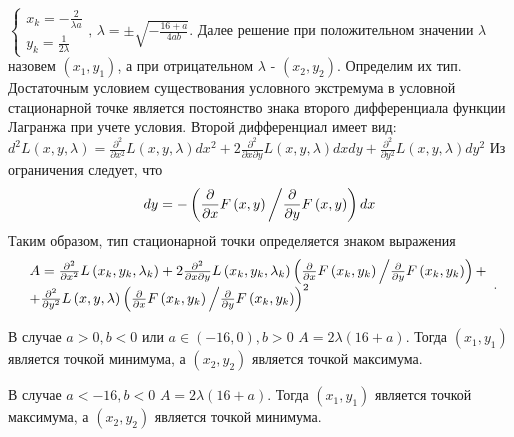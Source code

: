 \documentclass[addpoints, answers]{exam} %
\begin{document}
\begin{questions}
\begin{solution}
 $\left\{\begin{array}{c} {x_{k} =-\frac{2}{\lambda a} } \\ {y_{k} =\frac{1}{2\lambda } } \end{array}\right. ,\, \lambda =\pm \sqrt{-\frac{16+a}{4ab} } $. Далее решение при положительном значении $\lambda $ назовем $\left(x_{1} ,y_{1} \right)$, а при отрицательном $\lambda $ - $\left(x_{2} ,y_{2} \right)$. Определим их тип. Достаточным условием существования условного экстремума в условной стационарной точке является постоянство знака второго дифференциала функции Лагранжа при учете условия. Второй дифференциал имеет вид: $d^{2} L\left(x,y,\lambda \right)=\frac{\partial ^{2} }{\partial x^{2} } L\left(x,y,\lambda \right)dx^{2} +2\frac{\partial ^{2} }{\partial x\partial y} L\left(x,y,\lambda \right)dxdy+\frac{\partial ^{2} }{\partial y^{2} } L\left(x,y,\lambda \right)dy^{2} $ Из ограничения следует, что 
\[
dy=-\left({\frac{\partial }{\partial x} F\left(x,y\right) \mathord{\left/{\vphantom{\frac{\partial }{\partial x} F\left(x,y\right) \frac{\partial }{\partial y} F\left(x,y\right)}}\right.\kern-\nulldelimiterspace} \frac{\partial }{\partial y} F\left(x,y\right)} \right)dx
\]
Таким образом, тип стационарной точки определяется знаком выражения 
\[
\begin{array}{l} {A=\frac{\partial ^{2} }{\partial x^{2} } L\left(x_{k} ,y_{k} ,\lambda _{k} \right)+2\frac{\partial ^{2} }{\partial x\partial y} L\left(x_{k} ,y_{k} ,\lambda _{k} \right)\left({\frac{\partial }{\partial x} F\left(x_{k} ,y_{k} \right) \mathord{\left/{\vphantom{\frac{\partial }{\partial x} F\left(x_{k} ,y_{k} \right) \frac{\partial }{\partial y} F\left(x_{k} ,y_{k} \right)}}\right.\kern-\nulldelimiterspace} \frac{\partial }{\partial y} F\left(x_{k} ,y_{k} \right)} \right)+} \\ {+\frac{\partial ^{2} }{\partial y^{2} } L\left(x,y,\lambda \right)\left({\frac{\partial }{\partial x} F\left(x_{k} ,y_{k} \right) \mathord{\left/{\vphantom{\frac{\partial }{\partial x} F\left(x_{k} ,y_{k} \right) \frac{\partial }{\partial y} F\left(x_{k} ,y_{k} \right)}}\right.\kern-\nulldelimiterspace} \frac{\partial }{\partial y} F\left(x_{k} ,y_{k} \right)} \right)^{2} } \end{array}.
\] 

В случае $a>0,b<0$ или $a\in \left(-16,0\right),b>0$ $A=2\lambda (16+a)$. Тогда $\left(x_{1} ,y_{1} \right)$ является точкой минимума, а $\left(x_{2} ,y_{2} \right)$ является точкой максимума.

В случае $a<-16,b<0$ $A=2\lambda (16+a)$. Тогда $\left(x_{1} ,y_{1} \right)$ является точкой максимума, а $\left(x_{2} ,y_{2} \right)$ является точкой минимума.


\end{solution}
\end{questions}
\end{document}
